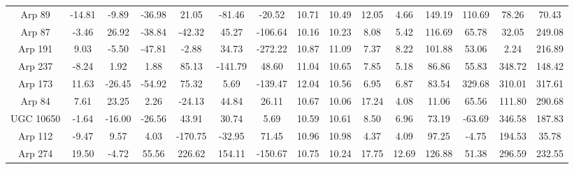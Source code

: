 \begin{table}
{\begin{tabular}{|c|c|c|c|c|c|c|c|c|c|c|c|c|c|c|}
       Arp 89 &   -14.81 &    -9.89 &   -36.98 &                21.05 &               -81.46 &               -20.52 &                          10.71 &                          10.49 &         12.05 &          4.66 &      149.19 &      110.69 &         78.26 &         70.43 \\
       Arp 87 &    -3.46 &    26.92 &   -38.84 &               -42.32 &                45.27 &              -106.64 &                          10.16 &                          10.23 &          8.08 &          5.42 &      116.69 &       65.78 &         32.05 &        249.08 \\
      Arp 191 &     9.03 &    -5.50 &   -47.81 &                -2.88 &                34.73 &              -272.22 &                          10.87 &                          11.09 &          7.37 &          8.22 &      101.88 &       53.06 &          2.24 &        216.89 \\
      Arp 237 &    -8.24 &     1.92 &     1.88 &                85.13 &              -141.79 &                48.60 &                          11.04 &                          10.65 &          7.85 &          5.18 &       86.86 &       55.83 &        348.72 &        148.42 \\
      Arp 173 &    11.63 &   -26.45 &   -54.92 &                75.32 &                 5.69 &              -139.47 &                          12.04 &                          10.56 &          6.95 &          6.87 &       83.54 &      329.68 &        310.01 &        317.61 \\
       Arp 84 &     7.61 &    23.25 &     2.26 &               -24.13 &                44.84 &                26.11 &                          10.67 &                          10.06 &         17.24 &          4.08 &       11.06 &       65.56 &        111.80 &        290.68 \\
    UGC 10650 &    -1.64 &   -16.00 &   -26.56 &                43.91 &                30.74 &                 5.69 &                          10.59 &                          10.61 &          8.50 &          6.96 &       73.19 &      -63.69 &        346.58 &        187.83 \\
      Arp 112 &    -9.47 &     9.57 &     4.03 &              -170.75 &               -32.95 &                71.45 &                          10.96 &                          10.98 &          4.37 &          4.09 &       97.25 &       -4.75 &        194.53 &         35.78 \\
      Arp 274 &    19.50 &    -4.72 &    55.56 &               226.62 &               154.11 &              -150.67 &                          10.75 &                          10.24 &         17.75 &         12.69 &      126.88 &       51.38 &        296.59 &        232.55 \\

\end{tabular}}
\end{table}
